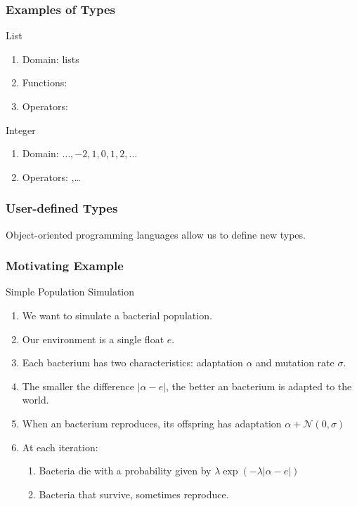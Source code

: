 \begin{frame}[fragile] 
\frametitle{Examples of Types}

\begin{block}{List}
\begin{enumerate}
\item Domain: lists
\item Functions: 
\item Operators: 
\end{enumerate}
\end{block}

\pause
\begin{block}{Integer}
\begin{enumerate}
\item Domain: $\dots,-2, 1, 0, 1, 2, \dots$
\item Operators: ,\ldots
\end{enumerate}
\end{block}
\end{frame}

\begin{frame}[fragile] 
\frametitle{User-defined Types}

Object-oriented programming languages allow us to define new types.

\end{frame}

\begin{frame}[fragile] 
\frametitle{Motivating Example}
\begin{block}{Simple Population Simulation}
\begin{enumerate}
\item We want to simulate a bacterial population.
\item Our environment is a single float $e$.
\item Each bacterium has two characteristics: adaptation $\alpha$ and mutation rate $\sigma$.
\item The smaller the difference $|\alpha-e|$, the better an bacterium is adapted to the world.
\item When an bacterium reproduces, its offspring has adaptation $\alpha + \mathcal{N}(0,\sigma)$
\item At each iteration:
\begin{enumerate}
\item Bacteria die with a probability given by $\lambda\exp(-\lambda|\alpha-e|)$
\item Bacteria that survive, sometimes reproduce.
\end{enumerate}
\end{enumerate}
\end{block}

\end{frame}

